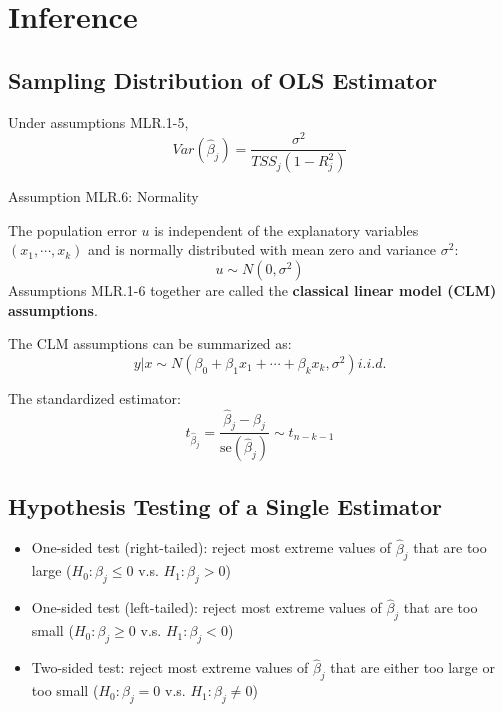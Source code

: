 \documentclass[11pt,a4paper]{article}
\begin{document}
\section{Inference}
\subsection{Sampling Distribution of OLS Estimator}
Under assumptions MLR.1-5, 
\[
Var(\hat{\beta}_j) = \frac{\sigma^2}{TSS_j (1 - R_j^2)}
\]


Assumption MLR.6: Normality \par
The population error $u$ is independent of the explanatory variables \\$(x_1, \cdots, x_k)$ and is normally distributed with mean zero and variance $\sigma^2$:
\[
u \sim N(0, \sigma^2)
\]
Assumptions MLR.1-6 together are called the \textbf{classical linear model (CLM) assumptions}. \par
The CLM assumptions can be summarized as:
\[
y | x \sim N(\beta_0 + \beta_1 x_1 + \cdots + \beta_k x_k, \sigma^2) i.i.d.
\]

The standardized estimator:
\[
t_{\hat{\beta}_j} = \frac{\hat{\beta}_j - \beta_j}{\text{se}(\hat{\beta}_j)} \sim t_{n-k-1}
\]

\subsection{Hypothesis Testing of a Single Estimator}
\begin{itemize}
    \item One-sided test (right-tailed): reject most extreme values of $\hat{\beta}_j$ that are too large ($H_0: \beta_j \leqslant 0$ v.s. $H_1: \beta_j > 0$)
    \item One-sided test (left-tailed): reject most extreme values of $\hat{\beta}_j$ that are too small ($H_0: \beta_j \geqslant 0$ v.s. $H_1: \beta_j < 0$)
    \item Two-sided test: reject most extreme values of $\hat{\beta}_j$ that are either too large or too small ($H_0: \beta_j = 0$ v.s. $H_1: \beta_j \neq 0$)
\end{itemize}
\end{document}
